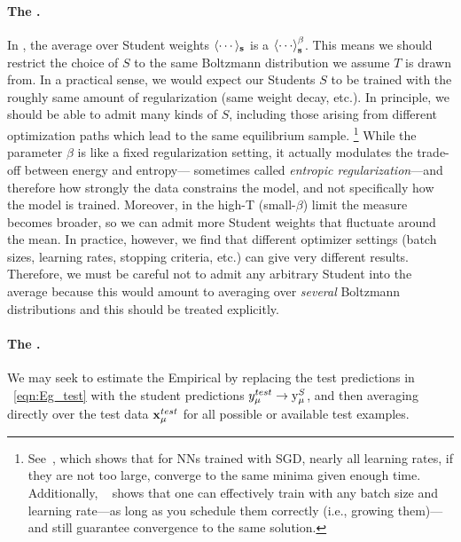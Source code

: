 \paragraph{The \ThermalAverage.} 
In \STATMECH, the average over Student weights $\langle\cdots\rangle_{{\mathbf{s}}}$ is a \ThermalAverage $\THRMAVG{\cdots}$.  This means we should restrict the choice of $S$ to the same Boltzmann distribution we assume $T$ is drawn from.  
In a practical sense, we would expect our Students $S$ to be trained with the roughly same amount of regularization (same weight decay, etc.). In principle, we should be able to admit many kinds of $S$, including those arising from
different optimization paths which lead to the same equilibrium sample. 
\footnote{See~\cite{WILSON20031429}, which shows that for NNs trained with SGD, nearly all learning rates, if they are not too large, converge to the same minima given enough time. Additionally, ~\cite{tsukada2024} shows that one can effectively train with any batch size and learning rate—as long as you schedule them correctly (i.e., growing them)—and still guarantee convergence to the same solution.}
While the parameter $\beta$ is like a fixed regularization setting,
it actually modulates the trade-off between energy and entropy—
sometimes called \emph{entropic regularization}—and therefore how strongly the
data constrains the model, and not specifically how the model is trained.
Moreover, in the high-T (small-$\beta$) limit the
measure becomes broader, so we can admit more Student weights that fluctuate 
around the mean.
In practice, however, we find
that different optimizer settings (batch sizes, learning rates, stopping criteria, etc.)  can give very different results.   
Therefore, we must be careful not to admit any arbitrary Student into the average
because this would amount to averaging over \emph{several} Boltzmann distributions and this should
be treated explicitly.  


\paragraph{The \AverageGeneralizationError.}
We may seek to estimate the Empirical \AverageGeneralizationError
by replacing the test predictions in \EQN~\ref{eqn:Eg_test} with the student predictions
$y_{\mu}^{test}\rightarrow \mathrm{y}_{\mu}^{S}$, and then averaging directly over the test data $\mathbf{x}_{\mu}^{test}$
for all possible or available test examples.

